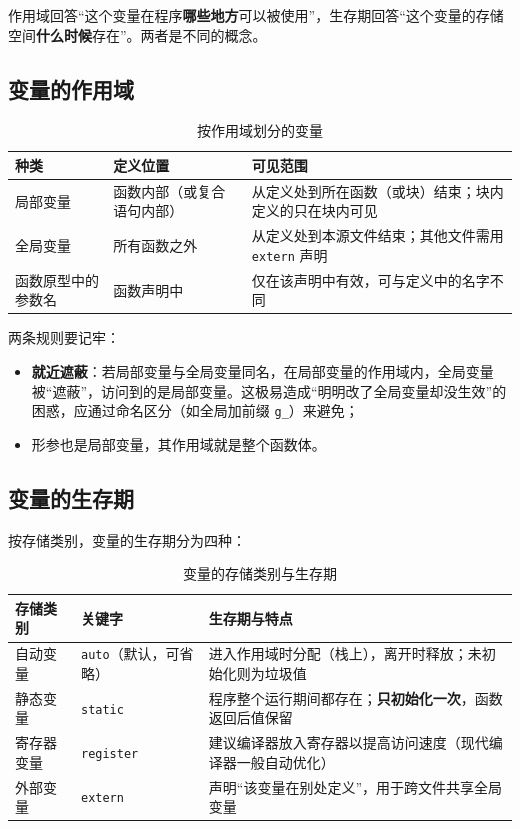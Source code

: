 作用域回答“这个变量在程序\textbf{哪些地方}可以被使用”，生存期回答“这个变量的存储空间\textbf{什么时候}存在”。两者是不同的概念。

\subsection{变量的作用域}

\begin{table}[htbp]
\centering
\caption{按作用域划分的变量}
\small
\begin{tabularx}{\textwidth}{@{}lXX@{}}
\toprule
种类 & 定义位置 & 可见范围 \\
\midrule
局部变量 & 函数内部（或复合语句内部） & 从定义处到所在函数（或块）结束；块内定义的只在块内可见 \\
全局变量 & 所有函数之外 & 从定义处到本源文件结束；其他文件需用 \texttt{extern} 声明 \\
函数原型中的参数名 & 函数声明中 & 仅在该声明中有效，可与定义中的名字不同 \\
\bottomrule
\end{tabularx}
\end{table}

两条规则要记牢：

\begin{itemize}
  \item \textbf{就近遮蔽}：若局部变量与全局变量同名，在局部变量的作用域内，全局变量被“遮蔽”，访问到的是局部变量。这极易造成“明明改了全局变量却没生效”的困惑，应通过命名区分（如全局加前缀 \texttt{g\_}）来避免；
  \item 形参也是局部变量，其作用域就是整个函数体。
\end{itemize}

\subsection{变量的生存期}

按存储类别，变量的生存期分为四种：

\begin{table}[htbp]
\centering
\caption{变量的存储类别与生存期}
\small
\begin{tabularx}{\textwidth}{@{}llX@{}}
\toprule
存储类别 & 关键字 & 生存期与特点 \\
\midrule
自动变量 & \texttt{auto}（默认，可省略） & 进入作用域时分配（栈上），离开时释放；未初始化则为垃圾值 \\
静态变量 & \texttt{static} & 程序整个运行期间都存在；\textbf{只初始化一次}，函数返回后值保留 \\
寄存器变量 & \texttt{register} & 建议编译器放入寄存器以提高访问速度（现代编译器一般自动优化） \\
外部变量 & \texttt{extern} & 声明“该变量在别处定义”，用于跨文件共享全局变量 \\
\bottomrule
\end{tabularx}
\end{table}

